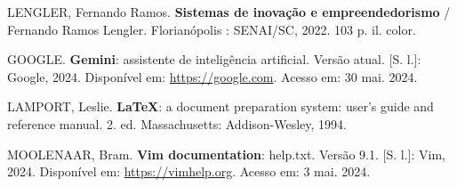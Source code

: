 \begin{flushleft}
\begin{enumerate}[label={[\arabic*]}] %
    \item LENGLER, Fernando Ramos. \textbf{Sistemas de inovação e empreendedorismo} / Fernando Ramos Lengler. Florianópolis : SENAI/SC, 2022. 103 p. il. color.
    \item GOOGLE. \textbf{Gemini}: assistente de inteligência artificial. Versão atual. [S. l.]: Google, 2024. Disponível em: \url{https://google.com}. Acesso em: 30 mai. 2024.

    \item LAMPORT, Leslie. \textbf{LaTeX}: a document preparation system: user's guide and reference manual. 2. ed. Massachusetts: Addison-Wesley, 1994.

    \item MOOLENAAR, Bram. \textbf{Vim documentation}: help.txt. Versão 9.1. [S. l.]: Vim, 2024. Disponível em: \url{https://vimhelp.org}. Acesso em: 3 mai. 2024.
\end{enumerate}
\end{flushleft}
